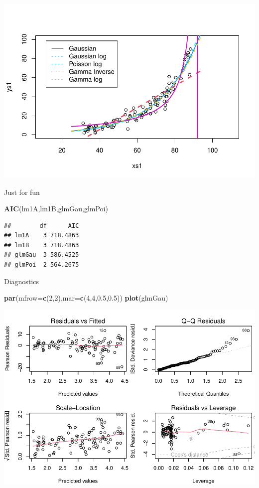 \documentclass[
]{book}
\newenvironment{Shaded}{\begin{snugshade}}{\end{snugshade}}
\newcommand{\DataTypeTok}[1]{\textcolor[rgb]{0.13,0.29,0.53}{#1}}
\newcommand{\DecValTok}[1]{\textcolor[rgb]{0.00,0.00,0.81}{#1}}
\newcommand{\FloatTok}[1]{\textcolor[rgb]{0.00,0.00,0.81}{#1}}
\newcommand{\KeywordTok}[1]{\textcolor[rgb]{0.13,0.29,0.53}{\textbf{#1}}}
\newcommand{\NormalTok}[1]{#1}
\begin{document}
\includegraphics{ECOMODbook_files/figure-latex/glm4-1.pdf}

Just for fun

\begin{Shaded}
\begin{Highlighting}[]
\KeywordTok{AIC}\NormalTok{(lm1A,lm1B,glmGau,glmPoi)}
\end{Highlighting}
\end{Shaded}

\begin{verbatim}
##        df      AIC
## lm1A    3 718.4863
## lm1B    3 718.4863
## glmGau  3 586.4525
## glmPoi  2 564.2675
\end{verbatim}

Diagnostics

\begin{Shaded}
\begin{Highlighting}[]
\KeywordTok{par}\NormalTok{(}\DataTypeTok{mfrow=}\KeywordTok{c}\NormalTok{(}\DecValTok{2}\NormalTok{,}\DecValTok{2}\NormalTok{),}\DataTypeTok{mar=}\KeywordTok{c}\NormalTok{(}\DecValTok{4}\NormalTok{,}\DecValTok{4}\NormalTok{,}\FloatTok{0.5}\NormalTok{,}\FloatTok{0.5}\NormalTok{))}
\KeywordTok{plot}\NormalTok{(glmGau)}
\end{Highlighting}
\end{Shaded}

\includegraphics{ECOMODbook_files/figure-latex/glm6-1.pdf}
\end{document}
